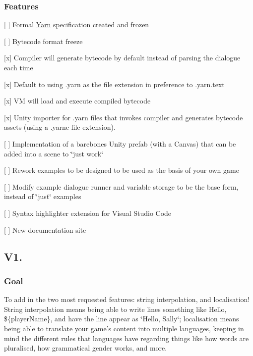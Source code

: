 \subsubsection*{Features}


\begin{DoxyItemize}
\item \mbox{[} \mbox{]} Formal \hyperlink{a00050}{Yarn} specification created and frozen
\item \mbox{[} \mbox{]} Bytecode format freeze
\item \mbox{[}x\mbox{]} Compiler will generate bytecode by default instead of parsing the dialogue each time
\item \mbox{[}x\mbox{]} Default to using {\ttfamily .yarn} as the file extension in preference to {\ttfamily .yarn.\-text}
\item \mbox{[}x\mbox{]} V\-M will load and execute compiled bytecode
\item \mbox{[}x\mbox{]} Unity importer for {\ttfamily .yarn} files that invokes compiler and generates bytecode assets (using a {\ttfamily .yarnc} file extension).
\item \mbox{[} \mbox{]} Implementation of a barebones Unity prefab (with a Canvas) that can be added into a scene to \char`\"{}just work\char`\"{}
\item \mbox{[} \mbox{]} Rework examples to be designed to be used as the basis of your own game
\item \mbox{[} \mbox{]} Modify example dialogue runner and variable storage to be the base form, instead of \char`\"{}just\char`\"{} examples
\item \mbox{[} \mbox{]} Syntax highlighter extension for Visual Studio Code
\item \mbox{[} \mbox{]} New documentation site
\end{DoxyItemize}

\subsection*{V1.}

\subsubsection*{Goal}

To add in the two most requested features\-: string interpolation, and localisation! String interpolation means being able to write lines something like {\ttfamily Hello, \$\{player\-Name\}}, and have the line appear as \char`\"{}\-Hello, Sally\char`\"{}; localisation means being able to translate your game's content into multiple languages, keeping in mind the different rules that languages have regarding things like how words are pluralised, how grammatical gender works, and more.

